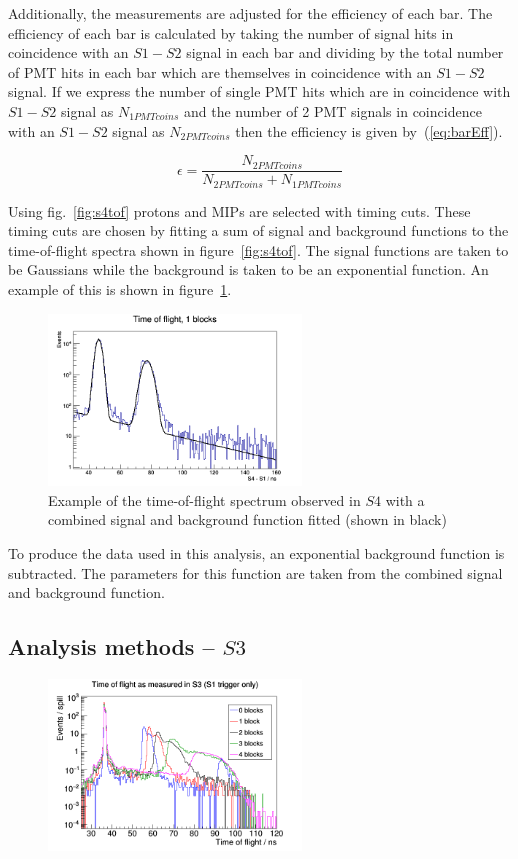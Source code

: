 	Additionally, the measurements are adjusted for the efficiency of each bar. The efficiency of each bar is calculated by taking the number of signal hits in coincidence with an $S1-S2$ signal in each bar and dividing by the total number of PMT hits in each bar which are themselves in coincidence with an $S1-S2$ signal. If we express the number of single PMT hits which are in coincidence with $S1-S2$ signal as $N_{1PMTcoins}$ and the number of 2 PMT signals in coincidence with an $S1-S2$ signal as $N_{2PMTcoins}$ then the efficiency is given by~(\ref{eq:barEff}).
	
	\begin{equation}
		\epsilon = \frac{N_{2PMTcoins}}{N_{2PMTcoins}+N_{1PMTcoins}}
		\label{eq:barEff}
	\end{equation}
	
	Using fig.~\ref{fig:s4tof} protons and MIPs are selected with timing cuts. These timing cuts are chosen by fitting a sum of signal and background functions to the time-of-flight spectra shown in figure~\ref{fig:s4tof}. The signal functions are taken to be Gaussians while the background is taken to be an exponential function. An example of this is shown in figure~\ref{fig:fitEx}.
	
	\begin{figure}[h]
		\centering
		\includegraphics[width=0.6\textwidth]{files/Figures/1_dtof1d}
		\caption{Example of the time-of-flight spectrum observed in $S4$ with a combined signal and background function fitted (shown in black)}
		\label{fig:fitEx}
	\end{figure}

	To produce the data used in this analysis, an exponential background function is subtracted. The parameters for this function are taken from the combined signal and background function.
	
	\subsection{Analysis methods -- $S3$}
	
	
	\begin{figure}[h]
		\centering
		\includegraphics[width=0.6\textwidth]{files/Figures/utof1dS1Log}
	\end{figure}
	